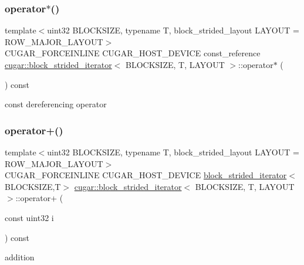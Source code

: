 \subsubsection{\texorpdfstring{operator$\ast$()}{operator*()}}
{\footnotesize\ttfamily template$<$uint32 B\+L\+O\+C\+K\+S\+I\+ZE, typename T, block\+\_\+strided\+\_\+layout L\+A\+Y\+O\+UT = R\+O\+W\+\_\+\+M\+A\+J\+O\+R\+\_\+\+L\+A\+Y\+O\+UT$>$ \\
C\+U\+G\+A\+R\+\_\+\+F\+O\+R\+C\+E\+I\+N\+L\+I\+NE C\+U\+G\+A\+R\+\_\+\+H\+O\+S\+T\+\_\+\+D\+E\+V\+I\+CE const\+\_\+reference \hyperlink{structcugar_1_1block__strided__iterator}{cugar\+::block\+\_\+strided\+\_\+iterator}$<$ B\+L\+O\+C\+K\+S\+I\+ZE, T, L\+A\+Y\+O\+UT $>$\+::operator$\ast$ (\begin{DoxyParamCaption}{ }\end{DoxyParamCaption}) const\hspace{0.3cm}{\ttfamily [inline]}}

const dereferencing operator \mbox{\label{structcugar_1_1block__strided__iterator_a864473fd53d2fea29614331eab808826}} 
\subsubsection{\texorpdfstring{operator+()}{operator+()}}
{\footnotesize\ttfamily template$<$uint32 B\+L\+O\+C\+K\+S\+I\+ZE, typename T, block\+\_\+strided\+\_\+layout L\+A\+Y\+O\+UT = R\+O\+W\+\_\+\+M\+A\+J\+O\+R\+\_\+\+L\+A\+Y\+O\+UT$>$ \\
C\+U\+G\+A\+R\+\_\+\+F\+O\+R\+C\+E\+I\+N\+L\+I\+NE C\+U\+G\+A\+R\+\_\+\+H\+O\+S\+T\+\_\+\+D\+E\+V\+I\+CE \hyperlink{structcugar_1_1block__strided__iterator}{block\+\_\+strided\+\_\+iterator}$<$B\+L\+O\+C\+K\+S\+I\+ZE,T$>$ \hyperlink{structcugar_1_1block__strided__iterator}{cugar\+::block\+\_\+strided\+\_\+iterator}$<$ B\+L\+O\+C\+K\+S\+I\+ZE, T, L\+A\+Y\+O\+UT $>$\+::operator+ (\begin{DoxyParamCaption}\item[{const uint32}]{i }\end{DoxyParamCaption}) const\hspace{0.3cm}{\ttfamily [inline]}}

addition \mbox{\label{structcugar_1_1block__strided__iterator_a0c43786d5b8c62d2cfbf7226cf0c4f63}} 
